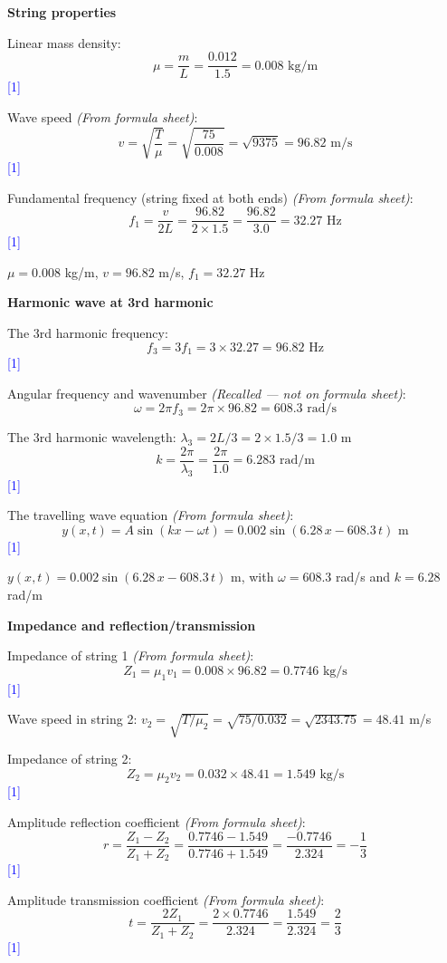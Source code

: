 \documentclass[12pt,a4paper]{article}
\newcommand{\markstep}[1]{\hfill\textcolor{blue}{[#1]}}
\newcommand{\finalanswer}[1]{%
  \begin{tcolorbox}[colback=green!5!white,colframe=green!50!black,boxrule=0.5pt]
  #1
  \end{tcolorbox}
}
\newcommand{\fromsheet}{\textit{(From formula sheet)}}
\newcommand{\recalled}{\textit{(Recalled --- not on formula sheet)}}
\begin{document}
\begin{parts}
\item \textbf{String properties} 

Linear mass density:
\[
\mu = \frac{m}{L} = \frac{0.012}{1.5} = 0.008 \text{ kg/m}
\]
\markstep{1}

Wave speed \fromsheet:
\[
v = \sqrt{\frac{T}{\mu}} = \sqrt{\frac{75}{0.008}} = \sqrt{9375} = 96.82 \text{ m/s}
\]
\markstep{1}

Fundamental frequency (string fixed at both ends) \fromsheet:
\[
f_1 = \frac{v}{2L} = \frac{96.82}{2 \times 1.5} = \frac{96.82}{3.0} = 32.27 \text{ Hz}
\]
\markstep{1}

\finalanswer{$\mu = 0.008$ kg/m, $v = 96.82$ m/s, $f_1 = 32.27$ Hz}

\item \textbf{Harmonic wave at 3rd harmonic} 

The 3rd harmonic frequency:
\[
f_3 = 3f_1 = 3 \times 32.27 = 96.82 \text{ Hz}
\]
\markstep{1}

Angular frequency and wavenumber \recalled:
\[
\omega = 2\pi f_3 = 2\pi \times 96.82 = 608.3 \text{ rad/s}
\]

The 3rd harmonic wavelength: $\lambda_3 = 2L/3 = 2 \times 1.5/3 = 1.0$ m
\[
k = \frac{2\pi}{\lambda_3} = \frac{2\pi}{1.0} = 6.283 \text{ rad/m}
\]
\markstep{1}

The travelling wave equation \fromsheet:
\[
y(x,t) = A\sin(kx - \omega t) = 0.002\sin(6.28\,x - 608.3\,t) \text{ m}
\]
\markstep{1}

\finalanswer{$y(x,t) = 0.002\sin(6.28\,x - 608.3\,t)$ m, with $\omega = 608.3$ rad/s and $k = 6.28$ rad/m}

\item \textbf{Impedance and reflection/transmission} 

Impedance of string 1 \fromsheet:
\[
Z_1 = \mu_1 v_1 = 0.008 \times 96.82 = 0.7746 \text{ kg/s}
\]
\markstep{1}

Wave speed in string 2: $v_2 = \sqrt{T/\mu_2} = \sqrt{75/0.032} = \sqrt{2343.75} = 48.41$ m/s

Impedance of string 2:
\[
Z_2 = \mu_2 v_2 = 0.032 \times 48.41 = 1.549 \text{ kg/s}
\]
\markstep{1}

Amplitude reflection coefficient \fromsheet:
\[
r = \frac{Z_1 - Z_2}{Z_1 + Z_2} = \frac{0.7746 - 1.549}{0.7746 + 1.549} = \frac{-0.7746}{2.324} = -\frac{1}{3}
\]
\markstep{1}

Amplitude transmission coefficient \fromsheet:
\[
t = \frac{2Z_1}{Z_1 + Z_2} = \frac{2 \times 0.7746}{2.324} = \frac{1.549}{2.324} = \frac{2}{3}
\]
\markstep{1}


\end{parts}
\end{document}
